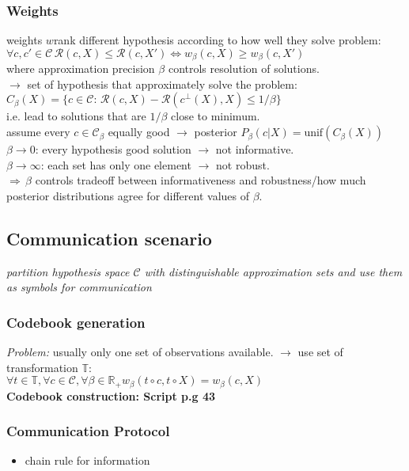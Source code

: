 \documentclass[9pt,parskip]{scrartcl}
\begin{document}
\begin{multicols*}{4}
\subsubsection*{Weights}
weights $w$rank different hypothesis according to how well they solve problem: \\
$\forall c, c' \in \mathcal{C} \, \mathcal{R}(c,X) \leq \mathcal{R}(c,X') \Leftrightarrow w_{\beta}(c,X) \geq w_{\beta}(c,X')$ \\
where approximation precision $\beta$ controls resolution of solutions. \\
$\to$ set of hypothesis that approximately solve the problem: \\$C_{\beta}(X)= \{c \in \mathcal{C} : \, \mathcal{R} (c,X) - \mathcal{R}(c^{\bot}(X),X) \leq 1/\beta \}$ \\
i.e. lead to solutions that are $1/\beta$ close to minimum. \\
assume every $c \in \mathcal{C}_{\beta}$ equally good $\to$ posterior $P_{\beta}(c|X) = \text{unif}(C_{\beta}(X))$ \\
$\beta \to 0$: every hypothesis good solution $\to$ not informative. \\
$\beta \to \infty$: each set has only one element $\to$ not robust. \\
$ \Rightarrow \, \beta$ controls tradeoff between informativeness and robustness/how much posterior distributions agree for different values of $\beta$.

\subsection*{Communication scenario}
\textit{partition hypothesis space $\mathcal{C}$ with distinguishable approximation sets and use them as symbols for communication}
\subsubsection*{Codebook generation}
\textit{Problem:} usually only one set of observations available. $\to$ use set of transformation $\mathbb{T}$: \\
$\forall t \in \mathbb{T}, \forall c \in \mathcal{C}, \forall{\beta} \in \mathbb{R}_{+} w_{\beta}(t \circ c, t \circ X) = w_{\beta}(c,X)$ \\
\textbf{Codebook construction: Script p.g 43}


\subsubsection*{Communication Protocol}

\vspace{5cm}
\begin{itemize}
	\item chain rule for information
\end{itemize}
\end{multicols*}
\end{document}
